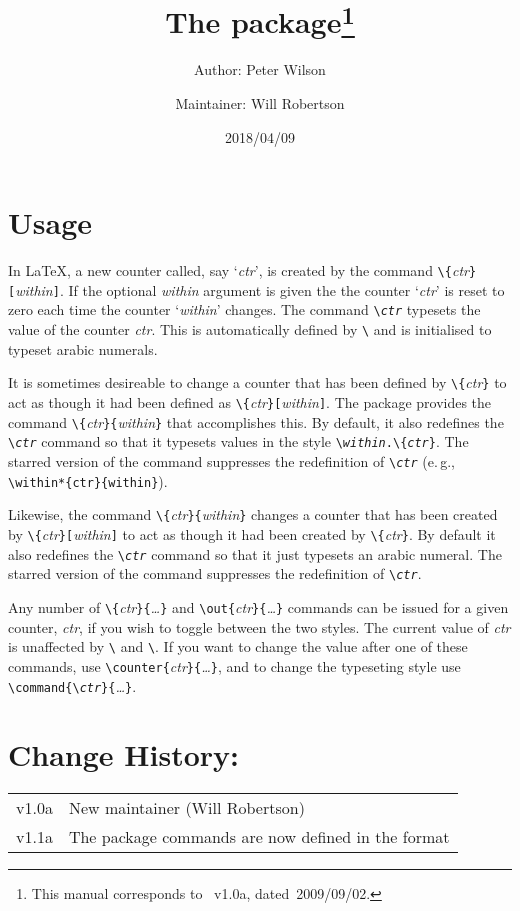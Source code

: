 \documentclass[DIV=7, pagesize=auto]{scrartcl}
\title{The \pkg{chngcntr} package\thanks{This manual corresponds to \pkg{chngcntr}~v1.0a, dated~2009/09/02.}}
\author{Author: Peter Wilson\and Maintainer: Will Robertson}
\date{2018/04/09}
\makeatletter
\newcommand*{\cs}[1]{\texttt{\textbackslash#1}}
\newcommand*{\cmd}[1]{\cs{\expandafter\@gobble\string#1}}
\newcommand*{\meta}[1]{\textlangle\textsl{#1}\textrangle}
\newcommand*{\marg}[1]{\texttt{\{}\meta{#1}\texttt{\}}}
\newcommand*{\oarg}[1]{\texttt{[}\meta{#1}\texttt{]}}
\newcommand*{\ml}[1]{\leavevmode\marginline{\small#1}\ignorespaces}
\makeatother
\begin{document}
\maketitle

\section{Usage}

In \LaTeX, a new counter called, say `\meta{ctr}', is created by the command
\cmd{\newcounter}\marg{ctr}\oarg{within}. If the optional \meta{within} argument is given
the the counter `\meta{ctr}' is reset to zero each time the counter `\meta{within}'
changes. The command \cmd{\the\meta{ctr}} typesets the value of the counter \meta{ctr}.
This is automatically defined by \cmd{\newcounter} and is initialised
to typeset arabic numerals.	

\ml{\cmd{\counterwithin}\\\cmd{\counterwithin*}}
It is sometimes desireable to change a counter that has been defined
by \cmd{\newcounter}\marg{ctr} to act as though it had been defined as 
\cmd{\newcounter}\marg{ctr}\oarg{within}. The package provides the command
\cmd{\counterwithin}\marg{ctr}\marg{within} that accomplishes this. By default,
it also redefines the \cmd{\the\meta{ctr}} command so that it typesets values
in the style \texttt{\cmd{\the\meta{within}}.\cmd{\arabic}\marg{ctr}}. The starred version of the
command suppresses the redefinition of \cmd{\the\meta{ctr}}
(e.\,g., \cmd{\counter\-within*}\verb+{ctr}{within}+).

\ml{\cmd{\counterwithout}\\\cmd{\counterwithout*}}
Likewise, the command \cmd{\counterwithout}\marg{ctr}\marg{within} changes a
counter that has been created by \cmd{\newcounter}\marg{ctr}\oarg{within} to act
as though it had been created by \cmd{\newcounter}\marg{ctr}. By default it
also redefines the \cmd{\the\meta{ctr}} command so that it just typesets an arabic
numeral. The starred version of the command suppresses the redefinition
of \cmd{\the\meta{ctr}}.

Any number of \cmd{\counterwithin}\marg{ctr}\marg{\ldots} and \cmd{\counterwith\-out}\marg{ctr}\marg{\ldots}
commands can be issued for a given counter, \meta{ctr}, if you wish to toggle
between the two styles. The current value of \meta{ctr} is unaffected by
\cmd{\counterwithin} and \cmd{\counterwithout}. If you want to change the value
after one of these commands, use \cmd{\set\-counter}\marg{ctr}\marg{\ldots}, and to change
the typeseting style use \cmd{\renew\-command}\texttt{\{}\cmd{\the\meta{ctr}}\texttt{\}}\marg{\ldots}.


\section{Change History:}

\begin{tabular}{@{}l@{ -- }l@{}}
  v1.0a & New maintainer (Will Robertson)\\  
  v1.1a & The package commands are now defined in the format 
\end{tabular}
\end{document}
